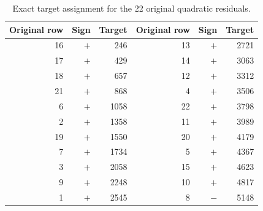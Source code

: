 \begin{table}[ht]
\centering
\begin{tabular}{rrr@{\qquad\qquad}rrr}
\toprule
Original row & Sign & Target & Original row & Sign & Target\\
\midrule
16 & $+$ & 246 & 13 & $+$ & 2721\\
17 & $+$ & 429 & 14 & $+$ & 3063\\
18 & $+$ & 657 & 12 & $+$ & 3312\\
21 & $+$ & 868 & 4 & $+$ & 3506\\
6 & $+$ & 1058 & 22 & $+$ & 3798\\
2 & $+$ & 1358 & 11 & $+$ & 3989\\
19 & $+$ & 1550 & 20 & $+$ & 4179\\
7 & $+$ & 1734 & 5 & $+$ & 4367\\
3 & $+$ & 2058 & 15 & $+$ & 4623\\
9 & $+$ & 2248 & 10 & $+$ & 4817\\
1 & $+$ & 2545 & 8 & $-$ & 5148\\
\bottomrule
\end{tabular}
\caption{Exact target assignment for the 22 original quadratic residuals.}
\label{tab:targets}
\end{table}
